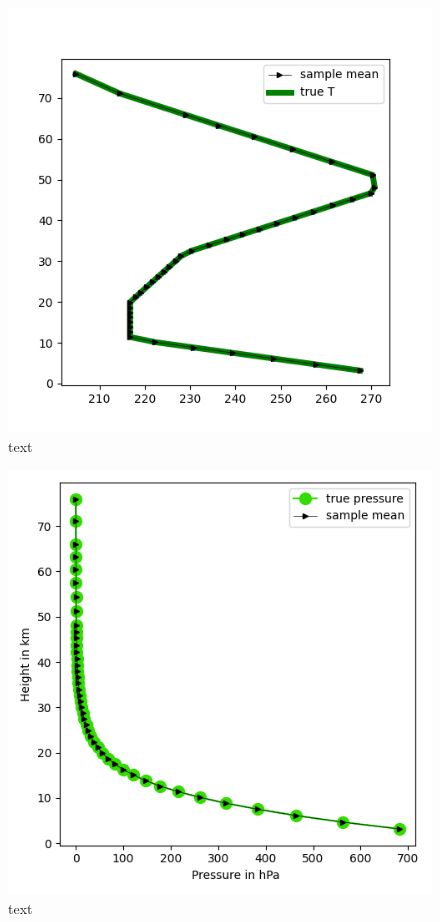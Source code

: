 \begin{figure}[h]
	\centering
	\includegraphics[width=\textwidth]{TemperatureSamp.png}
	\caption[]{text}
	\label{fig:Results}
\end{figure}

\begin{figure}[h]
	\centering
	\includegraphics[width=\textwidth]{samplesPressure.png}
	\caption[]{text}
	\label{fig:Results}
\end{figure}


